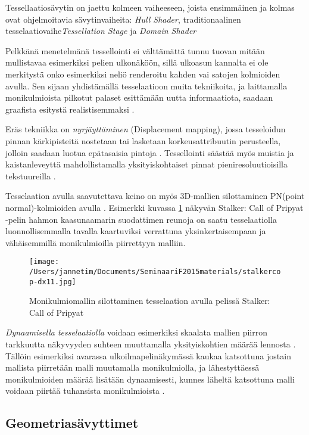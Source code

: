 \documentclass[finnish]{tktltiki2}
\theoremstyle{definition}
\theoremstyle{remark}
\begin{document}
Tessellaatiosävytin on jaettu kolmeen vaiheeseen, joista ensimmäinen ja kolmas ovat ohjelmoitavia sävytinvaiheita: \emph{Hull Shader}, traditionaalinen tesselaatiovaihe\emph{Tessellation Stage} ja \emph{Domain Shader}   \cite{Mic11}

Pelkkänä menetelmänä tessellointi ei välttämättä tunnu tuovan mitään mullistavaa esimerkiksi pelien ulkonäköön, sillä ulkoasun kannalta ei ole merkitystä onko esimerkiksi neliö renderoitu kahden vai satojen kolmioiden avulla. Sen sijaan yhdistämällä tesselaatioon muita tekniikoita, ja laittamalla monikulmioista pilkotut palaset esittämään uutta informaatiota, saadaan graafista esitystä realistisemmaksi \cite{Nvi10}. 

Eräs tekniikka on \emph{nyrjäyttäminen} (Displacement mapping), jossa tesseloidun pinnan kärkipisteitä nostetaan tai lasketaan korkeusattribuutin perusteella, jolloin saadaan luotua epätasaisia pintoja \cite{Nvi10}. Tessellointi säästää myös muistia ja kaistanleveyttä mahdollistamalla yksityiskohtaiset pinnat pieniresoluutioisilla tekstuureilla \cite{Mic11} \cite{Nvi10}.

Tesselaation avulla saavutettava keino on myös 3D-mallien silottaminen PN(point normal)-kolmioiden avulla \cite{Vla01}. Esimerkki kuvassa \ref{SCoP} näkyvän Stalker: Call of Pripyat -pelin hahmon kaasunaamarin suodattimen reunoja on saatu tesselaatiolla luonnollisemmalla tavalla kaartuviksi verrattuna yksinkertaisempaan ja vähäisemmillä monikulmioilla piirrettyyn malliin. 

\begin{figure}[!htbp]
\texttt{[image: /Users/jannetim/Documents/SeminaariF2015materials/stalkercop-dx11.jpg]}
\caption{Monikulmiomallin silottaminen tesselaation avulla pelissä Stalker: Call of Pripyat}
\label{SCoP}
\end{figure}

\emph{Dynaamisella tesselaatiolla} voidaan esimerkiksi skaalata mallien piirron tarkkuutta näkyvyyden suhteen muuttamalla yksityiskohtien määrää lennosta \cite{Nvi10}. Tällöin esimerkiksi avarassa ulkoilmapelinäkymässä kaukaa katsottuna jostain mallista piirretään malli muutamalla monikulmiolla, ja lähestyttäessä monikulmioiden määrää lisätään dynaamisesti, kunnes läheltä katsottuna malli voidaan piirtää tuhansista monikulmioista \cite{Gre14}.

\subsection{Geometriasävyttimet}
\end{document}
